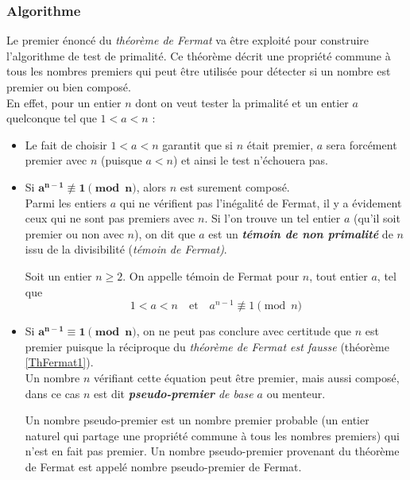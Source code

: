 	\subsubsection{Algorithme}
		Le premier énoncé du \textit{théorème de Fermat} va être exploité pour construire l'algorithme de test de primalité. Ce théorème décrit une propriété commune à tous les nombres premiers qui peut être utilisée pour détecter si un nombre est premier ou bien composé.\\
		\indent En effet, pour un entier $n$ dont on veut tester la primalité et un entier $a$ quelconque tel que $1 < a < n$ : 
		\begin{itemize}
			\item Le fait de choisir $1 < a < n$ garantit que si $n$ était premier, $a$ sera forcément premier avec $n$ (puisque $a < n$) et ainsi le test n'échouera pas. 
			\item Si $\mathbf{a^{n-1} \not\equiv 1 \pmod n}$, alors $n$ est surement composé.\\
			Parmi les entiers $a$ qui ne vérifient pas l'inégalité de Fermat, il y a évidement ceux qui ne sont pas premiers avec $n$. Si l'on trouve un tel entier $a$ (qu'il soit premier ou non avec $n$), on dit que $a$ est un \textit{\textbf{témoin de non primalité}} de $n$ issu de la divisibilité (\textit{témoin de Fermat)}.
					
					\vspace{-1.5em}\begin{adjustwidth}{1.5cm}{1.5cm} 
					\begin{Def}
						\label{TemFermat}
						Soit un entier $n \geqslant 2$. On appelle témoin de Fermat pour $n$, tout entier $a$, tel que
						\[1 < a < n  \quad \text{et} \quad a^{n-1} \not\equiv 1 \pmod n\]
					\end{Def}
					\end{adjustwidth}\vspace{0.5em}
					
			\item Si $\mathbf{a^{n-1}\equiv 1 \pmod n}$, on ne peut pas conclure avec certitude que $n$ est premier puisque la réciproque du \textit{théorème de Fermat est fausse} (théorème \ref{ThFermat1}).\\
				Un nombre $n$ vérifiant cette équation peut être premier, mais aussi composé, dans ce cas $n$ est dit \textit{\textbf{pseudo-premier} de base $a$} ou menteur.
					
					\vspace{-1.5em}\begin{adjustwidth}{1.5cm}{1.5cm} 
					\begin{Def}
						\label{PseudoPrem}
						Un nombre pseudo-premier est un nombre premier probable (un entier naturel qui partage une propriété commune à tous les nombres premiers) qui n'est en fait pas premier. Un nombre pseudo-premier provenant du théorème de Fermat est appelé nombre pseudo-premier de Fermat.
					\end{Def}
					\end{adjustwidth}\vspace{0.5em}
					

\end{itemize}
